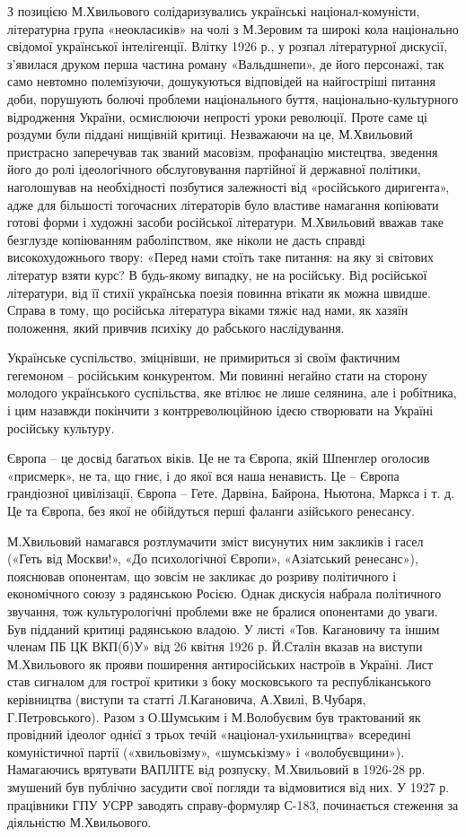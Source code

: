 З позицією М.Хвильового солідаризувались українські націонал-комуністи,
літературна група «неокласиків» на чолі з М.Зеровим та широкі кола національно
свідомої української інтелігенції. Влітку 1926 р., у розпал літературної
дискусії, з'явилася друком перша частина роману «Вальдшнепи», де його
персонажі, так само невтомно полемізуючи, дошукуються відповідей на найгостріші
питання доби, порушують болючі проблеми національного буття,
національно-культурного відродження України, осмислюючи непрості уроки
революції. Проте саме ці роздуми були піддані нищівній критиці. Незважаючи на
це, М.Хвильовий пристрасно заперечував так званий масовізм, профанацію
мистецтва, зведення його до ролі ідеологічного обслуговування партійної й
державної політики, наголошував на необхідності позбутися залежності від
«російського диригента», адже для більшості тогочасних літераторів було
властиве намагання копіювати готові форми і художні засоби російської
літератури. М.Хвильовий вважав таке безглузде копіюванням раболіпством, яке
ніколи не дасть справді високохудожнього твору: «Перед нами стоїть таке
питання: на яку зі світових літератур взяти курс? В будь-якому випадку, не на
російську. Від російської літератури, від її стихії українська поезія повинна
втікати як можна швидше. Справа в тому, що російська література віками тяжіє
над нами, як хазяїн положення, який привчив психіку до рабського наслідування.

Українське суспільство, зміцнівши, не примириться зі своїм фактичним гегемоном
– російським конкурентом. Ми повинні негайно стати на сторону молодого
українського суспільства, яке втілює не лише селянина, але і робітника, і цим
назавжди покінчити з контрреволюційною ідеєю створювати на Україні російську
культуру.

Європа – це досвід багатьох віків. Це не та Європа, якій Шпенглер оголосив
«присмерк», не та, що гниє, і до якої вся наша ненависть. Це – Європа
грандіозної цивілізації, Європа – Гете, Дарвіна, Байрона, Ньютона, Маркса і т.
д. Це та Європа, без якої не обійдуться перші фаланги азійського ренесансу.

М.Хвильовий намагався розтлумачити зміст висунутих ним закликів і гасел («Геть
від Москви!», «До психологічної Європи», «Азіатський ренесанс»), пояснював
опонентам, що зовсім не закликає до розриву політичного і економічного союзу з
радянською Росією. Однак дискусія набрала політичного звучання, тож
культурологічні проблеми вже не бралися опонентами до уваги. Був підданий
критиці радянською владою. У листі «Тов. Кагановичу та іншим членам ПБ ЦК
ВКП(б)У» від 26 квітня 1926 р. Й.Сталін вказав на виступи М.Хвильового як
прояви поширення антиросійських настроїв в Україні. Лист став сигналом для
гострої критики з боку московського та республіканського керівництва (виступи
та статті Л.Кагановича, А.Хвилі, В.Чубаря, Г.Петровського). Разом з О.Шумським
і М.Волобуєвим був трактований як провідний ідеолог однієї з трьох течій
«націонал-ухильництва» всередині комуністичної партії («хвильовізму»,
«шумськізму» і «волобуєвщини»). Намагаючись врятувати ВАПЛІТЕ від розпуску,
М.Хвильовий в 1926-28 рр. змушений був публічно засудити свої погляди та
відмовитися від них. У 1927 р. працівники ГПУ УСРР заводять справу-формуляр
С-183, починається стеження за діяльністю М.Хвильового. 

